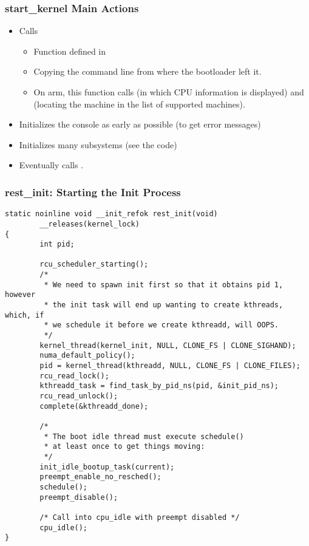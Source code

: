\begin{frame}
  \frametitle{start\_kernel Main Actions}
  \begin{itemize}
  \item Calls 
    \begin{itemize}
    \item Function defined in 
    \item Copying the command line from where the bootloader left it.
    \item On arm, this function calls  (in which
      CPU information is displayed) and (locating
      the machine in the list of supported machines).
    \end{itemize}
  \item Initializes the console as early as possible (to get error
    messages)
  \item Initializes many subsystems (see the code)
  \item Eventually calls .
  \end{itemize}
\end{frame}

\begin{frame}[fragile]
  \frametitle{rest\_init: Starting the Init Process}
\begin{verbatim}
static noinline void __init_refok rest_init(void)
        __releases(kernel_lock)
{
        int pid;

        rcu_scheduler_starting();
        /*
         * We need to spawn init first so that it obtains pid 1, however
         * the init task will end up wanting to create kthreads, which, if
         * we schedule it before we create kthreadd, will OOPS.
         */
        kernel_thread(kernel_init, NULL, CLONE_FS | CLONE_SIGHAND);
        numa_default_policy();
        pid = kernel_thread(kthreadd, NULL, CLONE_FS | CLONE_FILES);
        rcu_read_lock();
        kthreadd_task = find_task_by_pid_ns(pid, &init_pid_ns);
        rcu_read_unlock();
        complete(&kthreadd_done);

        /*
         * The boot idle thread must execute schedule()
         * at least once to get things moving:
         */
        init_idle_bootup_task(current);
        preempt_enable_no_resched();
        schedule();
        preempt_disable();

        /* Call into cpu_idle with preempt disabled */
        cpu_idle();
}
\end{verbatim}
\end{frame}

